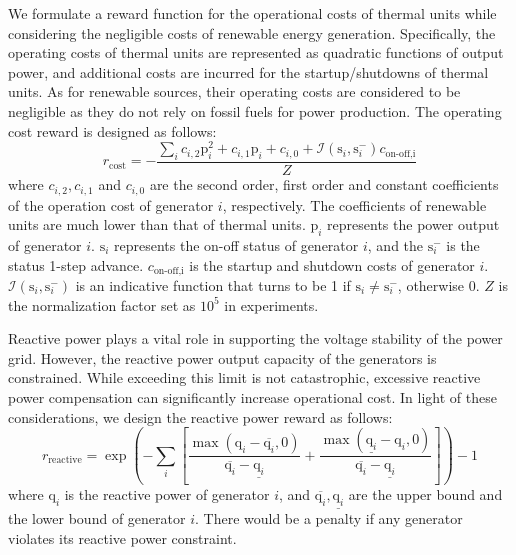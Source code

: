  We formulate a reward function for the operational costs of thermal units while considering the negligible costs of renewable energy generation. Specifically, the operating costs of thermal units are represented as quadratic functions of output power, and additional costs are incurred for the startup/shutdowns of thermal units. As for renewable sources, their operating costs are considered to be negligible as they do not rely on fossil fuels for power production. 
The operating cost reward is designed as follows:
\begin{equation}
    r_\text{cost} = -\frac{\sum_i c_{i,2}\text{p}_i^2+c_{i,1}\text{p}_i+c_{i,0}+\mathcal{I}(\text{s}_i, \text{s}_i^-)c_{\text{on-off,i}}}{Z}
\end{equation}
where $c_{i,2},c_{i,1}$ and $c_{i,0}$ are the second order, first order and constant coefficients of the operation cost of generator $i$, respectively. The coefficients of renewable units are much lower than that of thermal units. $\text{p}_i$ represents the power output of generator $i$. $\text{s}_i$ represents the on-off status of generator $i$, and the $\text{s}_i^-$ is the status 1-step advance. $c_\text{on-off,i}$ is the startup and shutdown costs of generator $i$. $\mathcal{I}(\text{s}_i, \text{s}_i^-)$ is an indicative function that turns to be 1 if $\text{s}_i\neq\text{s}_i^-$, otherwise 0. $Z$ is the normalization factor set as $10^5$ in experiments.

 Reactive power plays a vital role in supporting the voltage stability of the power grid. However, the reactive power output capacity of the generators is constrained. While exceeding this limit is not catastrophic, excessive reactive power compensation can significantly increase operational cost. In light of these considerations, we design 
the reactive power reward as follows:
\begin{equation}
    r_\text{reactive}=\exp\left(-\sum_i\left[\frac{\max(\text{q}_i-\overline{\text{q}_i},0)}{\overline{\text{q}_i}-\underline{\text{q}_i}}+\frac{\max(\underline{\text{q}_i}-\text{q}_i,0)}{\overline{\text{q}_i}-\underline{\text{q}_i}}\right]\right)-1
\end{equation}
where $\text{q}_i$ is the reactive power of generator $i$, and $\overline{\text{q}_i}, \underline{\text{q}_i}$ are the upper bound and the lower bound of generator $i$. There would be a penalty if any generator violates its reactive power constraint. 

